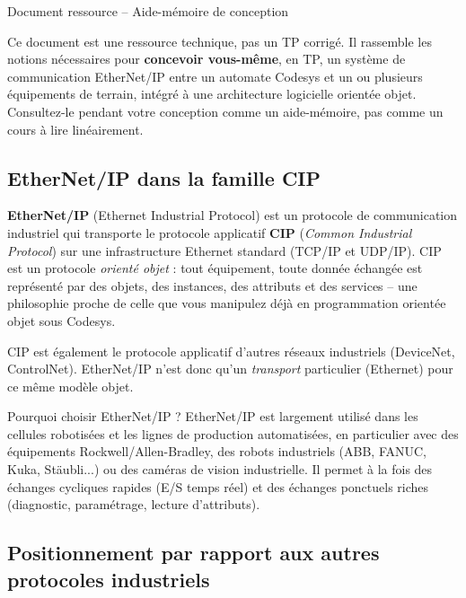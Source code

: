 \begin{center}
    {\large Document ressource -- Aide-mémoire de conception}
\end{center}

Ce document est une ressource technique, pas un TP corrigé. Il rassemble les notions nécessaires pour \textbf{concevoir vous-même}, en TP, un système de communication EtherNet/IP entre un automate Codesys et un ou plusieurs équipements de terrain, intégré à une architecture logicielle orientée objet. Consultez-le pendant votre conception comme un aide-mémoire, pas comme un cours à lire linéairement.

\subsection*{EtherNet/IP dans la famille CIP}
\textbf{EtherNet/IP} (Ethernet Industrial Protocol) est un protocole de communication industriel qui transporte le protocole applicatif \textbf{CIP} (\emph{Common Industrial Protocol}) sur une infrastructure Ethernet standard (TCP/IP et UDP/IP). CIP est un protocole \emph{orienté objet} : tout équipement, toute donnée échangée est représenté par des objets, des instances, des attributs et des services -- une philosophie proche de celle que vous manipulez déjà en programmation orientée objet sous Codesys.

CIP est également le protocole applicatif d'autres réseaux industriels (DeviceNet, ControlNet). EtherNet/IP n'est donc qu'un \emph{transport} particulier (Ethernet) pour ce même modèle objet.

\begin{UPSTIinfor}{Pourquoi choisir EtherNet/IP ?}
    EtherNet/IP est largement utilisé dans les cellules robotisées et les lignes de production automatisées, en particulier avec des équipements Rockwell/Allen-Bradley, des robots industriels (ABB, FANUC, Kuka, Stäubli...) ou des caméras de vision industrielle. Il permet à la fois des échanges cycliques rapides (E/S temps réel) et des échanges ponctuels riches (diagnostic, paramétrage, lecture d'attributs).
\end{UPSTIinfor}

\subsection*{Positionnement par rapport aux autres protocoles industriels}

